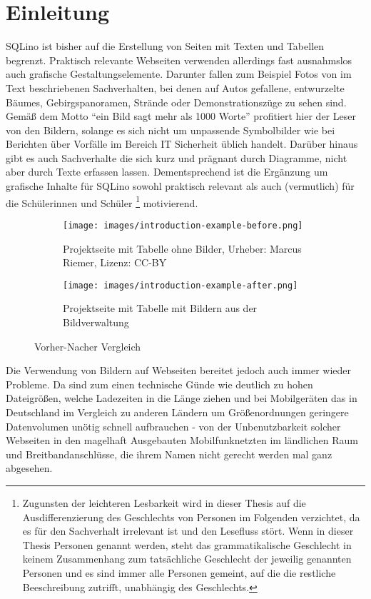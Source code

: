 \section{Einleitung}
\label{sec:introduction}

SQLino ist bisher auf die Erstellung von Seiten mit Texten und Tabellen
begrenzt. Praktisch relevante Webseiten verwenden allerdings fast ausnahmslos
auch grafische Gestaltungselemente. Darunter fallen zum Beispiel Fotos von im
Text beschriebenen Sachverhalten, bei denen auf Autos gefallene, entwurzelte
Bäumes, Gebirgspanoramen, Strände oder Demonstrationszüge zu sehen sind. Gemäß
dem Motto \enquote{ein Bild sagt mehr als 1000 Worte} profitiert hier der Leser
von den Bildern, solange es sich nicht um unpassende Symbolbilder wie bei
Berichten über Vorfälle im Bereich IT Sicherheit üblich handelt. Darüber hinaus
gibt es auch Sachverhalte die sich kurz und prägnant durch Diagramme, nicht aber
durch Texte erfassen lassen. Dementsprechend ist die Ergänzung um grafische
Inhalte für SQLino sowohl praktisch relevant als auch (vermutlich) für die
Schülerinnen und Schüler \footnote{Zugunsten der leichteren Lesbarkeit wird in
  dieser Thesis auf die Ausdifferenzierung des Geschlechts von Personen im
  Folgenden verzichtet, da es für den Sachverhalt irrelevant ist und den
  Lesefluss stört.  Wenn in dieser Thesis Personen genannt werden, steht   das
  grammatikalische Geschlecht in keinem Zusammenhang zum tatsächliche Geschlecht
  der jeweilig genannten Personen und es sind immer alle Personen gemeint, auf
  die die restliche Beeschreibung zutrifft, unabhängig des Geschlechts.}
motivierend.

\begin{figure}[ht]
  \begin{subfigure}[b]{\columnwidth}
    \texttt{[image: images/introduction-example-before.png]}
    \caption{Projektseite mit Tabelle ohne Bilder, Urheber: Marcus Riemer,
      Lizenz: CC-BY}
    \label{fig:comparison-before}
  \end{subfigure}
  \begin{subfigure}[b]{\columnwidth}
    \texttt{[image: images/introduction-example-after.png]}
    \caption{Projektseite mit Tabelle mit Bildern aus der Bildverwaltung}
    \label{fig:comparison-after}
  \end{subfigure}
  \caption{Vorher-Nacher Vergleich}
  \label{fig:comparison-before-after}
\end{figure}

Die Verwendung von Bildern auf Webseiten bereitet jedoch auch immer wieder
Probleme. Da sind zum einen technische Günde wie deutlich zu hohen Dateigrößen,
welche Ladezeiten in die Länge ziehen und bei Mobilgeräten das in Deutschland im
Vergleich zu anderen Ländern um Größenordnungen geringere Datenvolumen unötig
schnell aufbrauchen - von der Unbenutzbarkeit solcher Webseiten in den magelhaft
Ausgebauten Mobilfunknetzten im ländlichen Raum und Breitbandanschlüsse, die
ihrem Namen nicht gerecht werden mal ganz abgesehen.

